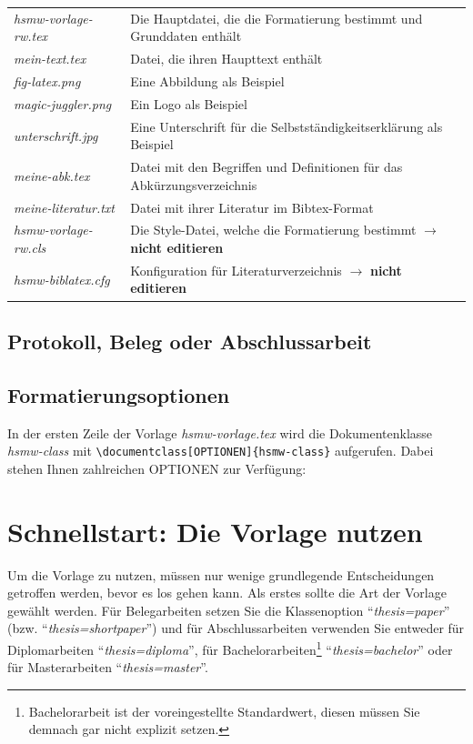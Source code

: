 \begin{tabular}{lp{}}
\textit{hsmw-vorlage-rw.tex} & Die Hauptdatei, die die Formatierung bestimmt und Grunddaten enthält \\
\textit{mein-text.tex} & Datei, die ihren Haupttext enthält \\
\textit{fig-latex.png} & Eine Abbildung als Beispiel\\
\textit{magic-juggler.png} & Ein Logo als Beispiel\\
\textit{unterschrift.jpg} & Eine Unterschrift für die Selbstständigkeitserklärung als Beispiel\\
\textit{meine-abk.tex} & Datei mit den Begriffen und Definitionen für das Abkürzungsverzeichnis\\
\textit{meine-literatur.txt} & Datei mit ihrer Literatur im Bibtex-Format\\
\textit{hsmw-vorlage-rw.cls} & Die Style-Datei, welche die Formatierung bestimmt $\rightarrow$ \textbf{nicht editieren}\\
\textit{hsmw-biblatex.cfg} & Konfiguration für Literaturverzeichnis  $\rightarrow$ \textbf{nicht editieren}\\
\end{tabular}

\section{Protokoll, Beleg oder Abschlussarbeit}


\section{Formatierungsoptionen}
In der ersten Zeile der Vorlage \textit{hsmw-vorlage.tex} wird die Dokumentenklasse \textit{hsmw-class}  mit \verb+\documentclass[OPTIONEN]{hsmw-class}+ aufgerufen. Dabei stehen Ihnen zahlreichen OPTIONEN zur Verfügung:

    \chapter{Schnellstart: Die Vorlage nutzen}
	
	Um die Vorlage zu nutzen, müssen nur wenige grundlegende Entscheidungen getroffen werden, bevor es los gehen kann.
	Als erstes sollte die Art der Vorlage gewählt werden.
	Für Belegarbeiten setzen Sie die Klassenoption \enquote{\textit{thesis=paper}} (bzw. \enquote{\textit{thesis=shortpaper}}) und für Abschlussarbeiten verwenden Sie entweder für Diplomarbeiten \enquote{\textit{thesis=diploma}}, für Bachelorarbeiten\footnote{Bachelorarbeit ist der voreingestellte Standardwert, diesen müssen Sie demnach gar nicht explizit setzen.} \enquote{\textit{thesis=bachelor}} oder für Masterarbeiten \enquote{\textit{thesis=master}}.
	
